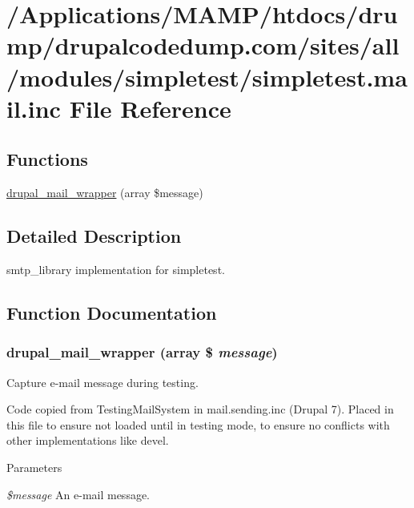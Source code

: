 \hypertarget{simpletest_8mail_8inc}{
\section{/Applications/MAMP/htdocs/drump/drupalcodedump.com/sites/all/modules/simpletest/simpletest.mail.inc File Reference}
\label{simpletest_8mail_8inc}
}
\subsection*{Functions}
\begin{DoxyCompactItemize}
\item 
\hyperlink{simpletest_8mail_8inc_a74e0adfe17e4cd75eff256b8499d5a49}{drupal\_\-mail\_\-wrapper} (array \$message)
\end{DoxyCompactItemize}


\subsection{Detailed Description}
smtp\_\-library implementation for simpletest. 

\subsection{Function Documentation}
\hypertarget{simpletest_8mail_8inc_a74e0adfe17e4cd75eff256b8499d5a49}{
\subsubsection[{drupal\_\-mail\_\-wrapper}]{\setlength{\rightskip}{0pt plus 5cm}drupal\_\-mail\_\-wrapper (array \$ {\em message})}}
\label{simpletest_8mail_8inc_a74e0adfe17e4cd75eff256b8499d5a49}
Capture e-\/mail message during testing.

Code copied from TestingMailSystem in mail.sending.inc (Drupal 7). Placed in this file to ensure not loaded until in testing mode, to ensure no conflicts with other implementations like devel.


\begin{DoxyParams}{Parameters}
\item[{\em \$message}]An e-\/mail message. \end{DoxyParams}
